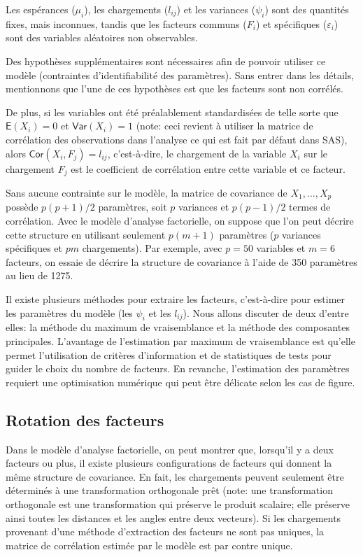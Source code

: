 \documentclass[
]{book}
\theoremstyle{definition}
\theoremstyle{definition}
\theoremstyle{definition}
\theoremstyle{remark}
\begin{document}
Les espérances (\(\mu_i\)), les chargements (\(l_{ij}\)) et les variances (\(\psi_i\)) sont des quantités fixes, mais inconnues, tandis que les facteurs communs (\(F_i\)) et spécifiques (\(\varepsilon_i\)) sont des variables aléatoires non observables.

Des hypothèses supplémentaires sont nécessaires afin de pouvoir utiliser ce modèle (contraintes d'identifiabilité des paramètres). Sans entrer dans les détails, mentionnons que l'une de ces hypothèses est que les facteurs sont non corrélés.

De plus, si les variables ont été préalablement standardisées de telle sorte que \({\mathsf E}\left(X_i\right)=0\) et \({\mathsf{Var}}\left(X_i\right)=1\) (note: ceci revient à utiliser la matrice de corrélation des observations dans l'analyse ce qui est fait par défaut dans \textsf{SAS}), alors \({\mathsf{Cor}}\left(X_i, F_j\right)=l_{ij}\), c'est-à-dire, le chargement de la variable \(X_i\) sur le chargement \(F_j\) est le coefficient de corrélation entre cette variable et ce facteur.

Sans aucune contrainte sur le modèle, la matrice de covariance de \(X_1, \ldots, X_p\) possède \(p(p+1)/2\) paramètres, soit \(p\) variances et \(p(p-1)/2\) termes de corrélation. Avec le modèle d'analyse factorielle, on suppose que l'on peut décrire cette structure en utilisant seulement \(p(m+1)\) paramètres (\(p\) variances spécifiques et \(pm\) chargements). Par exemple, avec \(p=50\) variables et \(m=6\) facteurs, on essaie de décrire la structure de covariance à l'aide de 350 paramètres au lieu de 1275.

Il existe plusieurs méthodes pour extraire les facteurs, c'est-à-dire pour estimer les paramètres du modèle (les \(\psi_i\) et les \(l_{ij}\)). Nous allons discuter de deux d'entre elles: la méthode du maximum de vraisemblance et la méthode des composantes principales. L'avantage de l'estimation par maximum de vraisemblance est qu'elle permet l'utilisation de critères d'information et de statistiques de tests pour guider le choix du nombre de facteurs. En revanche, l'estimation des paramètres requiert une optimisation numérique qui peut être délicate selon les cas de figure.

\hypertarget{rotation-des-facteurs}{%
\subsection{Rotation des facteurs}\label{rotation-des-facteurs}}

Dans le modèle d'analyse factorielle, on peut montrer que, lorsqu'il y a deux facteurs ou plus, il existe plusieurs configurations de facteurs qui donnent la même structure de covariance. En fait, les chargements peuvent seulement être déterminés à une transformation orthogonale prêt (note: une transformation orthogonale est une transformation qui préserve le produit scalaire; elle préserve ainsi toutes les distances et les angles entre deux vecteurs). Si les chargements provenant d'une méthode d'extraction des facteurs ne sont pas uniques, la matrice de corrélation estimée par le modèle est par contre unique.
\end{document}
